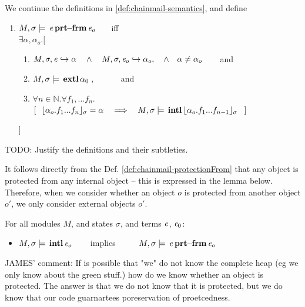 \begin{definition} 
\label{def:chainmail-protectionFrom}
We continue the definitions in \ref{def:chainmail-semantics}, and define   
\begin{enumerate}
\item
\label{cProtected}
$M , \sigma \models {\ensuremath{\, {\mathit{e}}\, \mathbf{prt\!\!-\!\!frm}}\, {\mathit{e}_{o}}}$  \ \ \ iff \\
  $\exists \alpha, \alpha_{o}. [\ $
\begin{enumerate}
\item $\eval{M}{\sigma}{{\re}}{\alpha} \ \ \ \wedge\ \ \  \eval{M}{\sigma}{{\re_{o}}}{\alpha_{o}},  \ \ \ \wedge\ \ \  \alpha \neq \alpha_{o}$\ \ \ \  and  
\item $M , \sigma \models {\ensuremath{\, \mathbf{extl}}\, \alpha_0\, }$, \ \ \ \ \ \ and  
\item 
$\forall n\in\mathbb{N}. \forall f_1,...f_n.$\\
$
[\ \ \interpret{\sigma}{\alpha_{o}.f_1...f_n}=\alpha \ \ \  \Longrightarrow \ \ \ \satisfiesA{M} {\sigma} {\internal{{\interpret{\sigma}{\alpha_{o}.f_1...f_{n-1}}}}}\ \ ]$
\end{enumerate}
\strut \hspace{.4cm} $]$
\end{enumerate}
\end{definition}

TODO: Justify the definitions and their subtleties. 

It follows directly from the Def. \ref{def:chainmail-protectionFrom} that any object is protected from any internal object --
this is expressed in the lemma below. Therefore, when we consider whether an object $o$ is protected from another object $o'$,  we only consider external objects $o'$.

\begin{lemma}
\label{lemma:internalProtects}
For all modules $M$, and states $\sigma$, and terms $\mathit{e}$, $\mathit{e}_0$:
\begin{itemize}
\item
$ M , \sigma \models {\ensuremath{\, \mathbf{intl}}\, \mathit{e}_o\, }$\ \ \ \ implies \ \ \ \ \  $M , \sigma \models {\ensuremath{\, {\mathit{e}}\, \mathbf{prt\!\!-\!\!frm}}\, {\mathit{e}_{o}}}$
\end{itemize}

\end{lemma}



JAMES' comment: If is possible that "we" do not know the complete heap (eg we only know about the green stuff.) how do we know whether an object is protected. The answer is that we do not know that it is protected, but we do know that our code guarnartees poreservation of proetcedness.

